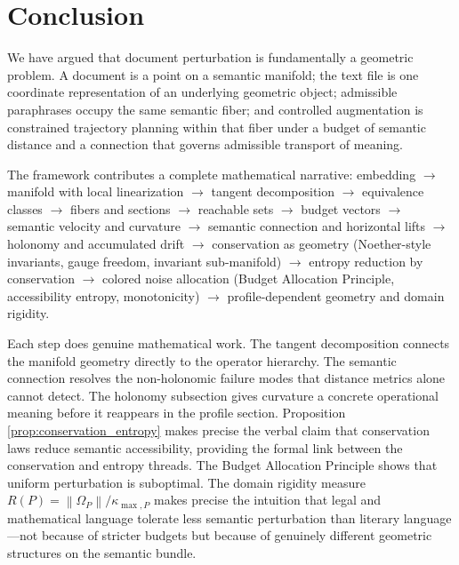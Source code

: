 \documentclass[12pt, a4paper]{article}
\theoremstyle{plain}
\theoremstyle{definition}
\theoremstyle{remark}
\newcommand{\norm}[1]{\left\lVert #1 \right\rVert}
\newcommand{\curv}{\Omega}
\begin{document}
\section{Conclusion}
\label{sec:conclusion}

We have argued that document perturbation is fundamentally a geometric problem.
A document is a point on a semantic manifold; the text file is one coordinate
representation of an underlying geometric object; admissible paraphrases occupy
the same semantic fiber; and controlled augmentation is constrained trajectory
planning within that fiber under a budget of semantic distance and a connection
that governs admissible transport of meaning.

The framework contributes a complete mathematical narrative: embedding $\to$
manifold with local linearization $\to$ tangent decomposition $\to$ equivalence
classes $\to$ fibers and sections $\to$ reachable sets $\to$ budget vectors $\to$
semantic velocity and curvature $\to$ semantic connection and horizontal lifts
$\to$ holonomy and accumulated drift $\to$ conservation as geometry
(Noether-style invariants, gauge freedom, invariant sub-manifold) $\to$ entropy
reduction by conservation $\to$ colored noise allocation (Budget Allocation
Principle, accessibility entropy, monotonicity) $\to$ profile-dependent geometry
and domain rigidity.

Each step does genuine mathematical work.  The tangent decomposition connects
the manifold geometry directly to the operator hierarchy.  The semantic
connection resolves the non-holonomic failure modes that distance metrics alone
cannot detect.  The holonomy subsection gives curvature a concrete operational
meaning before it reappears in the profile section.  Proposition
\ref{prop:conservation_entropy} makes precise the verbal claim that conservation
laws reduce semantic accessibility, providing the formal link between the
conservation and entropy threads.  The Budget Allocation Principle shows that
uniform perturbation is suboptimal.  The domain rigidity measure
$R(P) = \norm{\curv_P}/\kappa_{\max,P}$ makes precise the intuition that legal
and mathematical language tolerate less semantic perturbation than literary
language---not because of stricter budgets but because of genuinely different
geometric structures on the semantic bundle.
\end{document}
